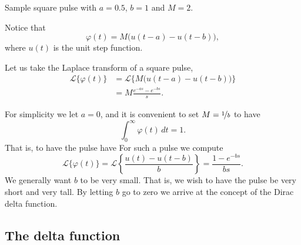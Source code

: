 \begin{mywrapfig}[15]{3.25in}
\capstart
{}
\caption{Sample square pulse with $a=0.5$, $b=1$ and $M = 2$.\label{lt:sqpulse}}
\end{mywrapfig}

Notice that
\begin{equation*}
\varphi(t) = M \bigl( u(t-a) - u(t-b) \bigr) ,
\end{equation*}
where $u(t)$ is the unit step function.

Let us take the Laplace transform of a square pulse,
\begin{equation*}
\begin{split}
{\mathcal{L}} \bigl\{ \varphi(t) \bigr\}
& =
{\mathcal{L}} \bigl\{ M \bigl( u(t-a) - u(t-b) \bigr)  \bigr\}
\\
& =
M
\frac{e^{-as} - e^{-bs}}{s} .
\end{split}
\end{equation*}

For simplicity we let $a=0$, and it is convenient
to set $M = \nicefrac{1}{b}$ to have
\begin{equation*}
\int_0^\infty \varphi(t) \,dt = 1 .
\end{equation*}
That is, to have the pulse have 
For such a pulse we
compute
\begin{equation*}
{\mathcal{L}} \bigl\{ \varphi(t) \bigr\}
=
{\mathcal{L}} \left\{ \frac{u(t) - u(t-b)}{b}  \right\}
=
\frac{1 - e^{-bs}}{bs} .
\end{equation*}
We generally want $b$ to be very small.  That is, we wish to have
the pulse be very short and very tall.  By letting $b$ go to zero we arrive
at the concept of the Dirac delta function.

\subsection{The delta function}

